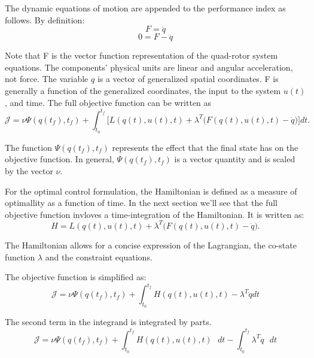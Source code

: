The dynamic equations of motion are appended to the performance index as follows. By definition:
\begin{equation}
     F = \ddot{q}
\end{equation}
\begin{equation}
    0 = F - \ddot{q}
\end{equation}

Note that F is the vector function representation of the quad-rotor system equations. The components' physical units are linear and angular acceleration, not force. The variable $q$ is a vector of generalized spatial coordinates. F is generally a function of the generalized coordinates, the input to the system $u(t)$, and time. The full objective function can be written as
\begin{equation}
    \mathcal{  J  } = \nu \Psi ( q(t_f),t_f ) + \int_{t_0}^{t_f}  \big[ L(q(t),u(t),t) + \lambda^T \big( F(q(t),u(t),t) - \ddot q \big)  \big] dt .
\end{equation}

The function $\Psi ( q(t_f),t_f )$ represents the effect that the final state has on the objective function. In general, $\Psi( q(t_f),t_f )$ is a vector quantity and is scaled by the vector $\nu$.

For the optimal control formulation, the Hamiltonian is defined as a measure of optimallity as a function of time. In the next section we'll see that the full objective function invloves a time-integration of the Hamiltonian. It is written as:
\begin{equation}
    H = L(q(t),u(t),t) + \lambda^T \big( F(q(t),u(t),t) - \ddot q\big).
\end{equation}

The Hamiltonian allows for a concise expression of the Lagrangian, the co-state function $\lambda$ and the constraint equations.

The objective function is simplified as:
\begin{equation}
    \mathcal{  J  } = \nu \Psi ( q(t_f),t_f ) + \int_{t_0}^{t_f}  H(q(t),u(t),t) - \lambda^T \ddot q  dt
\end{equation}

The second term in the integrand is integrated by parts.
\begin{equation}
    \mathcal{  J  } = \nu \Psi ( q(t_f),t_f ) + \int_{t_0}^{t_f}  H(q(t),u(t),t) \text{  } dt - \int_{t_0}^{t_f} \lambda^T \ddot q \text{  } dt
\end{equation}

